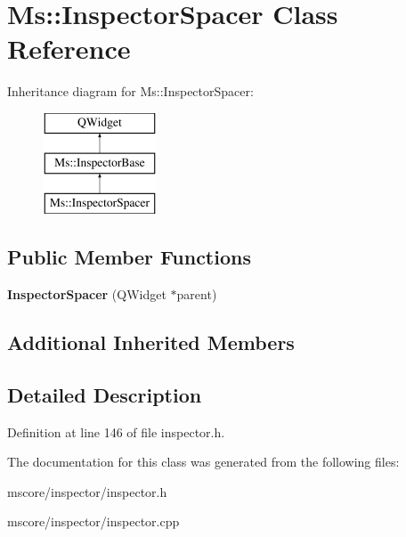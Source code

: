 \hypertarget{class_ms_1_1_inspector_spacer}{}\section{Ms\+:\+:Inspector\+Spacer Class Reference}
\label{class_ms_1_1_inspector_spacer}
Inheritance diagram for Ms\+:\+:Inspector\+Spacer\+:\begin{figure}[H]
\begin{center}
\leavevmode
\includegraphics[height=3.000000cm]{class_ms_1_1_inspector_spacer}
\end{center}
\end{figure}
\subsection*{Public Member Functions}
\begin{DoxyCompactItemize}
\item 
\mbox{\label{class_ms_1_1_inspector_spacer_a3b37052422e16bb9c1b6b1d4e2e609be}} 
{\bfseries Inspector\+Spacer} (Q\+Widget $\ast$parent)
\end{DoxyCompactItemize}
\subsection*{Additional Inherited Members}


\subsection{Detailed Description}


Definition at line 146 of file inspector.\+h.



The documentation for this class was generated from the following files\+:\begin{DoxyCompactItemize}
\item 
mscore/inspector/inspector.\+h\item 
mscore/inspector/inspector.\+cpp\end{DoxyCompactItemize}
